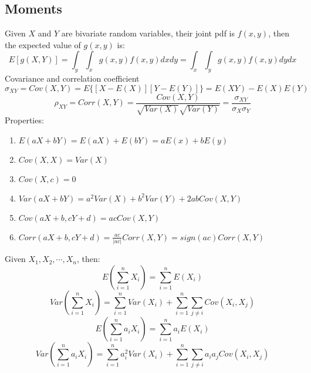 \documentclass[12pt]{article}
\begin{document}
\subsection*{Moments}
Given $X$ and $Y$ are bivariate random variables, their joint pdf is $f(x,y)$, then the expected value of $g(x,y)$ is:
\newline
\begin{equation}
    E[g(X,Y)]=\int_y\int_x g(x,y)f(x,y)dxdy = \int_x\int_y g(x,y)f(x,y)dydx
\end{equation}
\newline
\newline
Covariance and correlation coefficient
\newline
\begin{equation}
    \sigma_{XY}=Cov(X,Y)=E\{[X-E(X)][Y-E(Y)]\}=E(XY)-E(X)E(Y)
\end{equation}
\begin{equation}
    \rho_{XY}=Corr(X,Y)=\frac{Cov(X,Y)}{\sqrt{Var(X)}\sqrt{Var(Y)}}=\frac{\sigma_{XY}}{\sigma_X \sigma_Y}
\end{equation}
\newpage
Properties:
\begin{enumerate}
    \item $E(aX+bY)=E(aX)+E(bY)=aE(x)+bE(y)$
    \item $Cov(X,X)=Var(X)$
    \item $Cov(X,c)=0$
    \item $Var(aX+bY)=a^2Var(X)+b^2Var(Y)+2abCov(X,Y)$
    \item $Cov(aX+b,cY+d)=acCov(X,Y)$
    \item $Corr(aX+b,cY+d)=\frac{ac}{|ac|}Corr(X,Y)=sign(ac)Corr(X,Y)$
\end{enumerate}
Given $X_1,X_2,\cdots, X_n$, then:
\begin{equation}
    E(\sum_{i=1}^n X_i)=\sum_{i=1}^n E(X_i)
\end{equation}
\begin{equation}
    Var(\sum_{i=1}^n X_i)=\sum_{i=1}^n Var(X_i)+\sum_{i=1}^n\sum_{j\neq i}Cov(X_i,X_j)
\end{equation}
\begin{equation}
    E(\sum_{i=1}^n a_i X_i)=\sum_{i=1}^n a_i E(X_i)
\end{equation}
\begin{equation}
    Var(\sum_{i=1}^n a_i X_i)=\sum_{i=1}^n a_i^2 Var(X_i)+\sum_{i=1}^n \sum_{j \neq i}a_i a_j Cov(X_i, X_j)
\end{equation}
\end{document}
